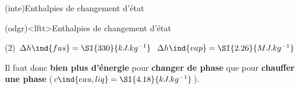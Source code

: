 \documentclass[../../main/main.tex]{subfiles}
\begin{document}
\begin{tcb*}(inte){Enthalpies de changement d'état}
	\begin{center}
		\vspace{-15pt}
	\end{center}
\end{tcb*}

\begin{tcb*}(odgr)<lftt>{Enthalpies de changement d'état}
	\begin{tasks}[label=\bdmd](2)
		\task $\Delta{h}\ind{fus} = \SI{330}{kJ.kg^{-1}}$
		\task $\Delta{h}\ind{vap} = \SI{2.26}{MJ.kg^{-1}}$
	\end{tasks}
	Il faut donc \textbf{bien plus d'énergie} pour \textbf{changer de phase} que
	pour \textbf{chauffer une phase} ($c\ind{eau,liq} = \SI{4.18}{kJ.kg^{-1}}$).
\end{tcb*}
\end{document}
